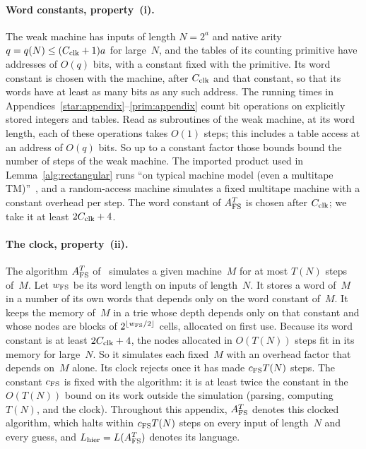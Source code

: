 \documentclass[11pt,letterpaper]{article}
\theoremstyle{definition}
\theoremstyle{remark}
\begin{document}
\paragraph{Word constants, property~(i).} The weak machine has inputs of
length $N=2^a$ and native arity $q=q(N)\le(C_{\rm clk}+1)a$ for
large~$N$, and the tables of its counting primitive have addresses of
$O(q)$ bits, with a constant fixed with the primitive. Its word constant
is chosen with the machine, after $C_{\rm clk}$ and that constant, so
that its words have at least as many bits as any such address. The
running times in Appendices~\ref{star:appendix}--\ref{prim:appendix}
count bit operations on explicitly stored integers and tables. Read as
subroutines of the weak machine, at its word length, each of these
operations takes $O(1)$ steps; this includes a table access at an
address of $O(q)$ bits. So up to a constant factor those bounds bound
the number of steps of the weak machine. The imported product used in
Lemma~\ref{alg:rectangular} runs ``on typical machine model (even a
multitape TM)''~\cite[Section~4]{WilliamsRect}, and a random-access
machine simulates a fixed multitape machine with a constant overhead
per step. The word constant of
$A^T_{\rm FS}$ is chosen after $C_{\rm clk}$; we take it at least
$2C_{\rm clk}+4$.

\paragraph{The clock, property~(ii).} The algorithm $A^T_{\rm FS}$
of~\cite[Definition~4.2]{CLW} simulates a given machine~$M$ for at most
$T(N)$ steps of~$M$. Let $w_{\rm FS}$ be its word length on inputs of
length~$N$. It stores a word of~$M$ in a number of its own words that
depends only on the word constant of~$M$. It keeps the memory of~$M$ in
a trie whose depth depends only on that constant and whose nodes are
blocks of $2^{\lfloor w_{\rm FS}/2\rfloor}$ cells, allocated on first
use. Because its word constant is at least $2C_{\rm clk}+4$, the nodes
allocated in $O(T(N))$ steps fit in its memory for large~$N$. So it
simulates each fixed~$M$ with an overhead factor that depends on~$M$
alone. Its clock rejects once it has made $c_{\rm FS}T(N)$ steps. The
constant $c_{\rm FS}$ is fixed with the algorithm: it is at least twice
the constant in the $O(T(N))$ bound on its work outside the simulation
(parsing, computing $T(N)$, and the clock). Throughout this appendix, $A^T_{\rm FS}$
denotes this clocked algorithm, which halts within $c_{\rm FS}T(N)$
steps on every input of length~$N$ and every guess, and
$L_{\rm hier}=L(A^T_{\rm FS})$ denotes its language.
\end{document}
